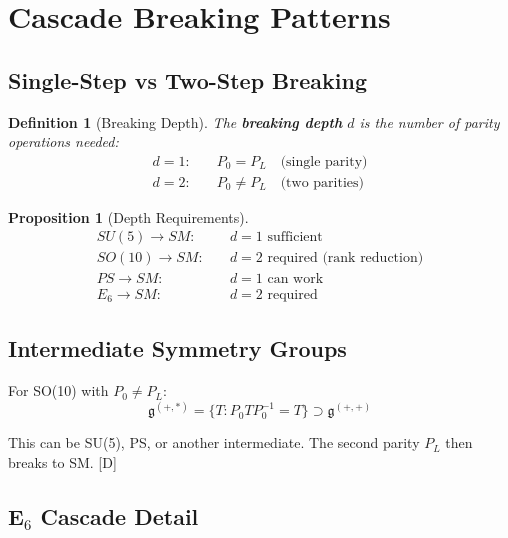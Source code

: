 \documentclass[11pt,a4paper]{article}
\newtheorem{proposition}[theorem]{Proposition}
\newtheorem{definition}[theorem]{Definition}
\newcommand{\tagD}{\textcolor{blue!70!black}{[D]}}
\begin{document}
\section{Cascade Breaking Patterns}
\label{app:cascade}

\subsection{Single-Step vs Two-Step Breaking}

\begin{definition}[Breaking Depth]
\label{def:depth}
The \textbf{breaking depth} $d$ is the number of parity operations needed:
\begin{align}
\label{eq:depth-1}
d = 1: \quad & P_0 = P_L \quad \text{(single parity)} \\
\label{eq:depth-2}
d = 2: \quad & P_0 \neq P_L \quad \text{(two parities)}
\end{align}
\end{definition}

\begin{proposition}[Depth Requirements]
\label{prop:depth-req}
\begin{align}
\label{eq:su5-depth}
SU(5) \to SM: \quad & d = 1 \text{ sufficient} \\
\label{eq:so10-depth}
SO(10) \to SM: \quad & d = 2 \text{ required (rank reduction)} \\
\label{eq:ps-depth}
PS \to SM: \quad & d = 1 \text{ can work} \\
\label{eq:e6-depth}
E_6 \to SM: \quad & d = 2 \text{ required}
\end{align}
\end{proposition}

\subsection{Intermediate Symmetry Groups}

For SO(10) with $P_0 \neq P_L$:
\begin{equation}
\label{eq:so10-intermediate}
\mathfrak{g}^{(+,*)} = \{T : P_0 T P_0^{-1} = T\} \supset \mathfrak{g}^{(+,+)}
\end{equation}

This can be SU(5), PS, or another intermediate. The second parity $P_L$ then
breaks to SM. \tagD

\subsection{E$_6$ Cascade Detail}
\end{document}
